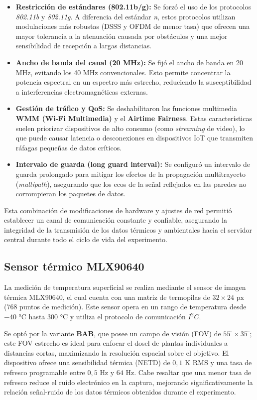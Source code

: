     \begin{itemize}
        \item \textbf{Restricción de estándares (802.11b/g):} Se forzó el uso de los protocolos \textit{802.11b} y \textit{802.11g}. A diferencia del estándar \textit{n}, estos protocolos utilizan modulaciones más robustas (DSSS y OFDM de menor tasa) que ofrecen una mayor tolerancia a la atenuación causada por obstáculos y una mejor sensibilidad de recepción a largas distancias.
        \item \textbf{Ancho de banda del canal (20 MHz):} Se fijó el ancho de banda en 20 MHz, evitando los 40 MHz convencionales. Esto permite concentrar la potencia espectral en un espectro más estrecho, reduciendo la susceptibilidad a interferencias electromagnéticas externas.
        \item \textbf{Gestión de tráfico y QoS:} Se deshabilitaron las funciones multimedia \textbf{WMM (Wi-Fi Multimedia)} y el \textbf{Airtime Fairness}. Estas características suelen priorizar dispositivos de alto consumo (como \textit{streaming} de video), lo que puede causar latencia o desconexiones en dispositivos IoT que transmiten ráfagas pequeñas de datos críticos.
        \item \textbf{Intervalo de guarda (long guard interval):} Se configuró un intervalo de guarda prolongado para mitigar los efectos de la propagación multitrayecto (\textit{multipath}), asegurando que los ecos de la señal reflejados en las paredes no corrompieran los paquetes de datos.
    \end{itemize}

    Esta combinación de modificaciones de hardware y ajustes de red permitió establecer un canal de comunicación constante y confiable, asegurando la integridad de la transmisión de los datos térmicos y ambientales hacia el servidor central durante todo el ciclo de vida del experimento.

    \subsection{Sensor térmico MLX90640}
    \label{subsec:hardware_mlx90640}
    La medición de temperatura superficial se realiza mediante el sensor de imagen térmica MLX90640, el cual cuenta con una matriz de termopilas de $32 \times 24\text{ px}$ (768 puntos de medición). Este sensor opera en un rango de temperatura desde $-40$ °C hasta $300$ °C y utiliza el protocolo de comunicación $I^2C$. 

    Se optó por la variante \textbf{BAB}, que posee un campo de visión (FOV) de $55^\circ \times 35^\circ$; este FOV estrecho es ideal para enfocar el dosel de plantas individuales a distancias cortas, maximizando la resolución espacial sobre el objetivo. El dispositivo ofrece una sensibilidad térmica (NETD) de $0,1\text{ K}$ RMS y una tasa de refresco programable entre $0,5\text{ Hz}$ y $64\text{ Hz}$. Cabe resaltar que una menor tasa de refresco reduce el ruido electrónico en la captura, mejorando significativamente la relación señal-ruido de los datos térmicos obtenidos durante el experimento.

